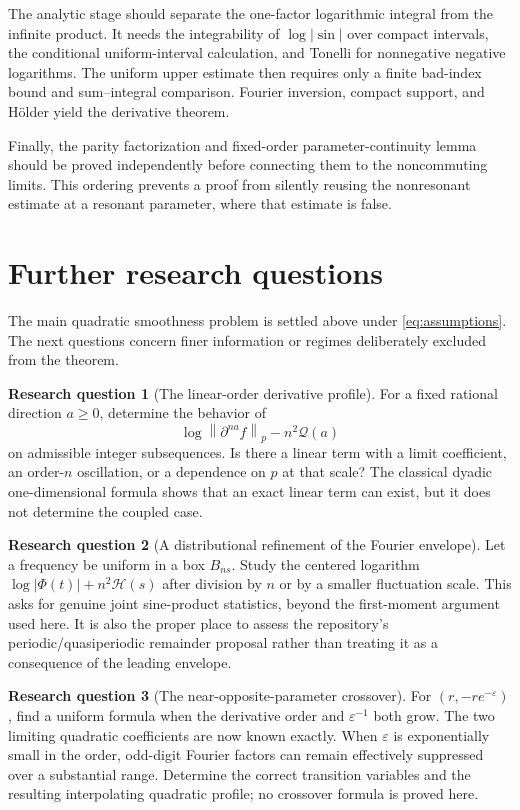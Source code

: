 \documentclass[11pt,a4paper]{article}
\numberwithin{equation}{section}
\theoremstyle{definition}
\newtheorem{question}{Research question}
\theoremstyle{remark}\newtheorem{remark}[theorem]{Remark}
\newcommand{\He}{\mathcal H}
\newcommand{\Qf}{\mathcal Q}
\newcommand{\norm}[1]{\left\lVert #1\right\rVert}
\begin{document}
The analytic stage should separate the one-factor logarithmic integral from
the infinite product. It needs the integrability of $\log|\sin|$ over compact
intervals, the conditional uniform-interval calculation, and Tonelli for
nonnegative negative logarithms. The uniform upper estimate then requires
only a finite bad-index bound and sum--integral comparison. Fourier inversion,
compact support, and H\"older yield the derivative theorem.

Finally, the parity factorization and fixed-order parameter-continuity lemma
should be proved independently before connecting them to the noncommuting
limits. This ordering prevents a proof from silently reusing the
nonresonant estimate at a resonant parameter, where that estimate is false.

\section{Further research questions}
\label{sec:questions}

The main quadratic smoothness problem is settled above under
\eqref{eq:assumptions}. The next questions concern finer information or
regimes deliberately excluded from the theorem.

\begin{question}[The linear-order derivative profile]
For a fixed rational direction $a\ge0$, determine the behavior of
\[
 \log\norm{\partial^{na}f}_p-n^2\Qf(a)
\]
on admissible integer subsequences. Is there a linear term with a limit
coefficient, an order-$n$ oscillation, or a dependence on $p$ at that scale?
The classical dyadic one-dimensional formula shows that an exact linear
term can exist, but it does not determine the coupled case.
\end{question}

\begin{question}[A distributional refinement of the Fourier envelope]
Let a frequency be uniform in a box $B_{ns}$. Study the centered logarithm
$\log|\Phi(t)|+n^2\He(s)$ after division by $n$ or by a smaller fluctuation
scale. This asks for genuine joint sine-product statistics, beyond the
first-moment argument used here. It is also the proper place to assess the
repository's periodic/quasiperiodic remainder proposal rather than treating
it as a consequence of the leading envelope.
\end{question}

\begin{question}[The near-opposite-parameter crossover]
For $(r,-re^{-\varepsilon})$, find a uniform formula when the derivative order
and $\varepsilon^{-1}$ both grow. The two limiting quadratic coefficients are
now known exactly. When $\varepsilon$ is exponentially small in the order,
odd-digit Fourier factors can remain effectively suppressed over a substantial
range. Determine the correct transition variables and the resulting
interpolating quadratic profile; no crossover formula is proved here.
\end{question}
\end{document}

